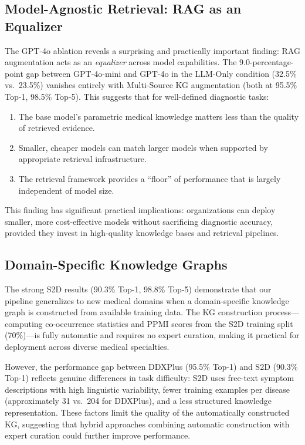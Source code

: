\documentclass[review]{elsarticle}
\begin{document}
\subsection{Model-Agnostic Retrieval: RAG as an Equalizer}

The GPT-4o ablation reveals a surprising and practically important finding: RAG augmentation acts as an \emph{equalizer} across model capabilities. The 9.0-percentage-point gap between GPT-4o-mini and GPT-4o in the LLM-Only condition (32.5\% vs.\ 23.5\%) vanishes entirely with Multi-Source KG augmentation (both at 95.5\% Top-1, 98.5\% Top-5). This suggests that for well-defined diagnostic tasks:

\begin{enumerate}
    \item The base model's parametric medical knowledge matters less than the quality of retrieved evidence.
    \item Smaller, cheaper models can match larger models when supported by appropriate retrieval infrastructure.
    \item The retrieval framework provides a ``floor'' of performance that is largely independent of model size.
\end{enumerate}

This finding has significant practical implications: organizations can deploy smaller, more cost-effective models without sacrificing diagnostic accuracy, provided they invest in high-quality knowledge bases and retrieval pipelines.

\subsection{Domain-Specific Knowledge Graphs}

The strong S2D results (90.3\% Top-1, 98.8\% Top-5) demonstrate that our pipeline generalizes to new medical domains when a domain-specific knowledge graph is constructed from available training data. The KG construction process---computing co-occurrence statistics and PPMI scores from the S2D training split (70\%)---is fully automatic and requires no expert curation, making it practical for deployment across diverse medical specialties.

However, the performance gap between DDXPlus (95.5\% Top-1) and S2D (90.3\% Top-1) reflects genuine differences in task difficulty: S2D uses free-text symptom descriptions with high linguistic variability, fewer training examples per disease (approximately 31 vs.\ 204 for DDXPlus), and a less structured knowledge representation. These factors limit the quality of the automatically constructed KG, suggesting that hybrid approaches combining automatic construction with expert curation could further improve performance.
\end{document}
